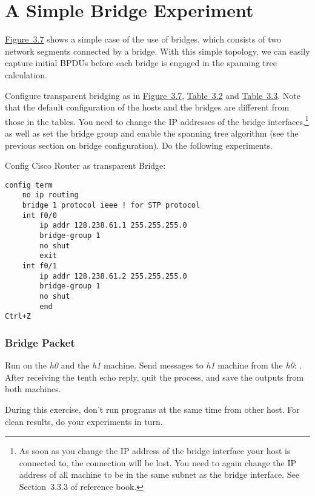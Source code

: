 \documentclass{../UTNetLab}
\begin{document}
\part{A Simple Bridge Experiment}
    \hyperref[fig:3.7]{Figure~3.7} shows a simple case of the use of bridges, which consists of two network segments connected by a bridge.
    With this simple topology, we can easily capture initial BPDUs before each bridge is engaged in the spanning tree calculation.

    Configure transparent bridging as in \hyperref[fig:3.7]{Figure~3.7}, \hyperref[tab:3.2]{Table~3.2} and \hyperref[tab:3.3]{Table~3.3}.
    Note that the default configuration of the hosts and the bridges are different from those in the tables.
    You need to change the IP addresses of the bridge interfaces,\footnote{As soon as you change the IP address of the bridge interface your host is connected to, the  connection will be lost.
    You need to again change the IP address of all machine to be in the same subnet as the bridge interface.
    See Section~3.3.3  of reference book.} as well as set the bridge group and enable the spanning tree algorithm (see the previous section on bridge configuration).
    Do the following experiments.

    Config Cisco Router as transparent Bridge:
    \begin{lstlisting}[language={cisco}]
config term
    no ip routing
    bridge 1 protocol ieee ! for STP protocol
    int f0/0
        ip addr 128.238.61.1 255.255.255.0
        bridge-group 1
        no shut
        exit
    int f0/1
        ip addr 128.238.61.2 255.255.255.0
        bridge-group 1
        no shut
        end
Ctrl+Z
    \end{lstlisting}

\section{Bridge Packet}
    Run  on the \textit{h0} and the \textit{h1} machine.
    Send  messages to \textit{h1} machine from the \textit{h0}: .
    After receiving the tenth echo reply, quit the  process, and save the  outputs from both machines.

    During this exercise, don’t run  programs at the same time from other host.
    For clean results, do your experiments in turn.
\end{document}
